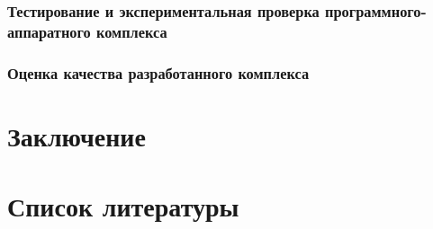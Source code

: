 \hypertarget{ux442ux435ux441ux442ux438ux440ux43eux432ux430ux43dux438ux435-ux438-ux44dux43aux441ux43fux435ux440ux438ux43cux435ux43dux442ux430ux43bux44cux43dux430ux44f-ux43fux440ux43eux432ux435ux440ux43aux430-ux43fux440ux43eux433ux440ux430ux43cux43cux43dux43eux433ux43e-ux430ux43fux43fux430ux440ux430ux442ux43dux43eux433ux43e-ux43aux43eux43cux43fux43bux435ux43aux441ux430}{%
\subsubsection{Тестирование и экспериментальная проверка
программного-аппаратного
комплекса}\label{ux442ux435ux441ux442ux438ux440ux43eux432ux430ux43dux438ux435-ux438-ux44dux43aux441ux43fux435ux440ux438ux43cux435ux43dux442ux430ux43bux44cux43dux430ux44f-ux43fux440ux43eux432ux435ux440ux43aux430-ux43fux440ux43eux433ux440ux430ux43cux43cux43dux43eux433ux43e-ux430ux43fux43fux430ux440ux430ux442ux43dux43eux433ux43e-ux43aux43eux43cux43fux43bux435ux43aux441ux430}}

\hypertarget{ux43eux446ux435ux43dux43aux430-ux43aux430ux447ux435ux441ux442ux432ux430-ux440ux430ux437ux440ux430ux431ux43eux442ux430ux43dux43dux43eux433ux43e-ux43aux43eux43cux43fux43bux435ux43aux441ux430}{%
\subsubsection{Оценка качества разработанного
комплекса}\label{ux43eux446ux435ux43dux43aux430-ux43aux430ux447ux435ux441ux442ux432ux430-ux440ux430ux437ux440ux430ux431ux43eux442ux430ux43dux43dux43eux433ux43e-ux43aux43eux43cux43fux43bux435ux43aux441ux430}}

\hypertarget{ux437ux430ux43aux43bux44eux447ux435ux43dux438ux435}{%
\section{Заключение}\label{ux437ux430ux43aux43bux44eux447ux435ux43dux438ux435}}

\hypertarget{ux441ux43fux438ux441ux43eux43a-ux43bux438ux442ux435ux440ux430ux442ux443ux440ux44b}{%
\section{Список
литературы}\label{ux441ux43fux438ux441ux43eux43a-ux43bux438ux442ux435ux440ux430ux442ux443ux440ux44b}}
